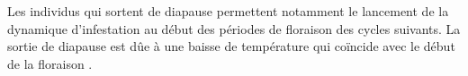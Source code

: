 
Les individus qui sortent de diapause permettent notamment le lancement de la dynamique d'infestation au début des périodes de floraison des cycles suivants.
La sortie de diapause est dûe à une baisse de température qui coïncide avec le début de la floraison \citep{pauldiap}.
























